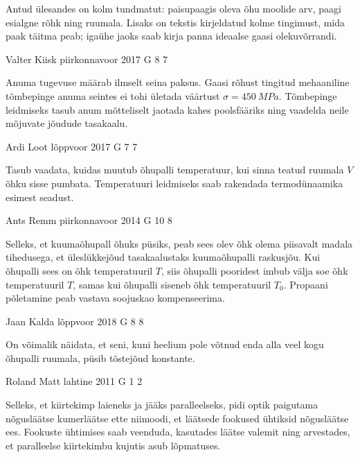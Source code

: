 \documentclass[11pt]{article}
\begin{document}
{{\ifHint
Antud ülesandes on kolm tundmatut: paisupaagis oleva õhu moolide arv, paagi esialgne rõhk ning ruumala. Lisaks on tekstis kirjeldatud kolme tingimust, mida paak täitma peab; igaühe jaoks saab kirja panna ideaalse gaasi olekuvõrrandi.
\fi
}

{Valter Kiisk} %
{piirkonnavoor} %
{2017} %
{G 8} %
{7} %
{

\ifHint
Anuma tugevuse määrab ilmselt seina paksus. Gaasi rõhust tingitud mehaaniline tõmbepinge anuma seintes ei tohi ületada väärtust $\sigma=\SI{450}{MPa}$. Tõmbepinge leidmiseks tasub anum mõtteliselt jaotada kahes poolsfääriks ning vaadelda neile mõjuvate jõudude tasakaalu.
\fi
}

{Ardi Loot} %
{lõppvoor} %
{2017} %
{G 7} %
{7} %
{

\ifHint
Tasub vaadata, kuidas muutub õhupalli temperatuur, kui sinna teatud ruumala $V$ õhku sisse pumbata. Temperatuuri leidmiseks saab rakendada termodünaamika esimest seadust.
\fi
}

{Ants Remm} %
{piirkonnavoor} %
{2014} %
{G 10} %
{8} %
{

\ifHint
Selleks, et kuumaõhupall õhuks püsiks, peab sees olev õhk olema piisavalt madala tihedusega, et üleslükkejõud tasakaalustaks kuumaõhupalli raskusjõu. Kui õhupalli sees on õhk temperatuuril $T$, siis õhupalli pooridest imbub välja soe õhk temperatuuril $T$, samas kui õhupalli siseneb õhk temperatuuril $T_0$. Propaani põletamine peab vastava soojuskao kompenseerima.
\fi
}

{Jaan Kalda} %
{lõppvoor} %
{2018} %
{G 8} %
{8} %
{

\ifHint
On võimalik näidata, et seni, kuni heelium pole võtnud enda alla veel kogu õhupalli ruumala, püsib tõstejõud konstante.
\fi
}

{Roland Matt} %
{lahtine} %
{2011} %
{G 1} %
{2} %
{

\ifHint
Selleks, et kiirtekimp laieneks ja jääks paralleelseks, pidi optik paigutama
nõgusläätse kumerläätse ette niimoodi, et läätsede fookused ühtiksid nõgusläätse
ees. Fookuste ühtimises saab veenduda, kasutades läätse valemit ning arvestades, et paralleelse kiirtekimbu kujutis asub lõpmatuses.
\fi
}

}
\end{document}
